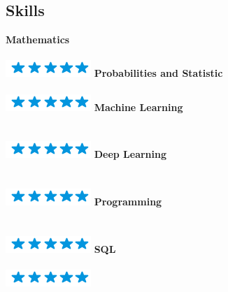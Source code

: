 \documentclass[]{friggeri-cv}
\begin{document}
\begin{aside}
    \section{Skills}
    \textbf{Mathematics}\\\vspace{-.08in}{\tiny 10+ years of experience}\\\includegraphics[scale=0.40]{img/5stars.png}  		
  	\textbf{Probabilities and Statistic}\\\vspace{-.08in}{\tiny 3+ years of experience}\\\includegraphics[scale=0.40]{img/5stars.png}  	
    \textbf{Machine Learning}\\\vspace{-.08in}{\tiny 2+ years of experience}\\\vspace{-.05in}{\scriptsize Scikit-Learn}\\\includegraphics[scale=0.40]{img/5stars.png}
    \textbf{Deep Learning}\\\vspace{-.08in}{\tiny 1+ years of experience}\\\vspace{-.05in}{\scriptsize Pytorch, Tensorflow, Keras}\\\includegraphics[scale=0.40]{img/5stars.png}  
  	\textbf{Programming}\\\vspace{-.08in}{\tiny 8+ years of experience}\\\vspace{-.05in}{\scriptsize Python, R \& Matlab}\\\includegraphics[scale=0.40]{img/5stars.png}   
    \textbf{SQL}\\\vspace{-.08in}{\tiny 1+ years of experience}\\\includegraphics[scale=0.40]{img/5stars.png}

\end{aside}
\end{document}
